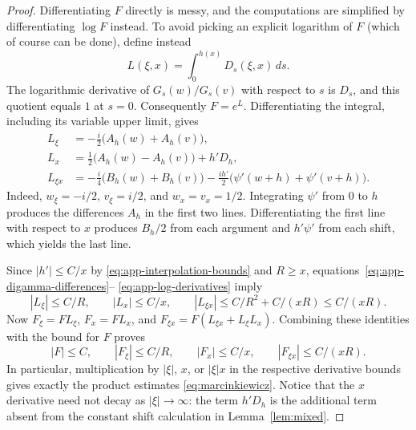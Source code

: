 \documentclass[11pt,a4paper,reqno,backref=page]{amsart}
\numberwithin{equation}{section}
\theoremstyle{definition}
\theoremstyle{remark}
\begin{document}
\begin{proof}
  Differentiating $F$ directly is messy, and the computations
  are simplified by differentiating $\log F$ instead.
  To avoid picking an explicit logarithm of $F$ (which of course
  can be done), define instead
  \begin{equation*}
    L(\xi,x)=\int_0^{h(x)}D_s(\xi,x)\,ds.
  \end{equation*}
  The logarithmic derivative of $G_s(w)/G_s(v)$ with
  respect to $s$ is $D_s$, and this quotient equals $1$
  at $s=0$. Consequently $F=e^L$. Differentiating the
  integral, including its variable upper limit, gives
  \begin{equation}\label{eq:app-log-derivatives}
    \begin{aligned}
      L_\xi
      &=-\frac i2\bigl(A_h(w)+A_h(v)\bigr),\\
      L_x
      &=\frac12\bigl(A_h(w)-A_h(v)\bigr)+h'D_h,\\
      L_{\xi x}
      &=-\frac i4\bigl(B_h(w)+B_h(v)\bigr)
        -\frac{ih'}2
        \bigl(\psi'(w+h)+\psi'(v+h)\bigr).
    \end{aligned}
  \end{equation}
  Indeed, $w_\xi=-i/2$, $v_\xi=i/2$, and $w_x=v_x=1/2$.
  Integrating $\psi'$ from $0$ to $h$ produces the
  differences $A_h$ in the first two lines. Differentiating
  the first line with respect to $x$ produces $B_h/2$
  from each argument and $h'\psi'$ from each shift, which
  yields the last line.

  Since $|h'|\le C/x$ by
  \eqref{eq:app-interpolation-bounds} and $R\ge x$,
  equations~\eqref{eq:app-digamma-differences}--
  \eqref{eq:app-log-derivatives} imply
  \begin{equation*}
    |L_\xi|\le C/R,\qquad |L_x|\le C/x,\qquad
    |L_{\xi x}|\le C/R^2+C/(xR)\le C/(xR).
  \end{equation*}
  Now $F_\xi=FL_\xi$, $F_x=FL_x$, and
  $F_{\xi x}=F(L_{\xi x}+L_\xi L_x)$. Combining these
  identities with the bound for $F$ proves
  \begin{equation}\label{eq:app-mixed-bounds}
    |F|\le C,\qquad |F_\xi|\le C/R,\qquad
    |F_x|\le C/x,\qquad |F_{\xi x}|\le C/(xR).
  \end{equation}
  In particular, multiplication by $|\xi|$, $x$, or
  $|\xi|x$ in the respective derivative bounds gives
  exactly the product estimates
  \eqref{eq:marcinkiewicz}. Notice that the $x$ derivative
  need not decay as $|\xi|\to\infty$: the term $h'D_h$
  is the additional term absent from the constant shift
  calculation in Lemma~\ref{lem:mixed}.


\end{proof}
\end{document}
